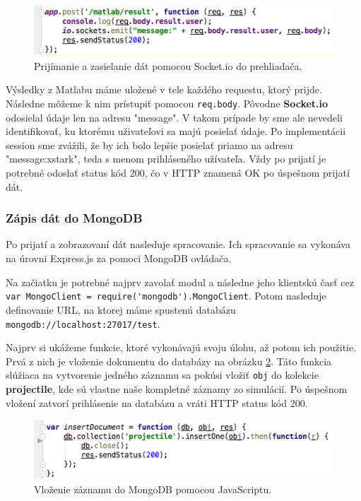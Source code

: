 \begin{figure}[H]
  \centering
  \includegraphics[scale=0.7]{img/code/express-socketio.png}
  \caption{Prijímanie a zasielanie dát pomocou Socket.io do prehliadača.}
  \label{img-express-socketio}
\end{figure}

Výsledky z Matlabu máme uložené v tele každého requestu, ktorý prijde. Následne môžeme k nim prístupiť pomocou \verb|req.body|. Pôvodne \textbf{Socket.io} odosielal údaje len na adresu "message". V takom prípade by sme ale nevedeli identifikovať, ku ktorému uživateľovi sa majú posielať údaje. Po implementácii session sme zvážili, že by ich bolo lepšie posielať priamo na adresu "message:xstark", teda s menom prihláseného užívateľa. Vždy po prijatí je potrebné odoslať status kód 200, čo v HTTP znamená OK po úspešnom prijatí dát.


\subsubsection{Zápis dát do MongoDB}
Po prijatí a zobrazovaní dát nasleduje spracovanie. Ich spracovanie sa vykonáva na úrovni Express.js za pomoci MongoDB ovládača.

Na začiatku je potrebné najprv zavolať modul a následne jeho klientskú časť cez \verb|var MongoClient = require('mongodb').MongoClient|. Potom nasleduje definovanie URL, na ktorej máme spustenú databázu \verb|mongodb://localhost:27017/test|.

Najprv si ukážeme funkcie, ktoré vykonávajú svoju úlohu, až potom ich použitie. Prvá z nich je vloženie dokumentu do databázy na obrázku \ref{img-express-mongo-insert}. Táto funkcia slúžiaca na vytvorenie jedného záznamu sa pokúsi vložiť \verb|obj| do kolekcie \textbf{projectile}, kde sú vlastne naše kompletné záznamy zo simulácií. Po úspešnom vložení zatvorí prihlásenie na databázu a vráti HTTP status kód 200.

\begin{figure}[H]
  \centering
  \includegraphics[scale=0.7]{img/code/express-mongo-insert.png}
  \caption{Vloženie záznamu do MongoDB pomocou JavaScriptu.}
  \label{img-express-mongo-insert}
\end{figure}

